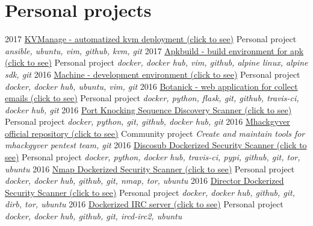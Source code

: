 \documentclass[]{friggeri-cv}
\begin{document}
\newpage

\section{Personal projects}
\begin{entrylist}
    \entry
        {2017}
        {\href{https://github.com/sweet-sinatra/ubuntu-install/tree/master/ansible}{KVManage - automatized kvm deployment (click to see)}}
        {Personal project}
        {\emph{ansible, ubuntu, vim, github, kvm, git}}
    \entry
        {2017}
        {\href{https://github.com/gr0und-s3ct0r/apkbuild}{Apkbuild - build environment for apk (click to see)}}
        {Personal project}
        {\emph{docker, docker hub, vim, github, alpine linux, alpine sdk, git}}
    \entry
        {2016}
        {\href{https://github.com/4383/machine}{Machine - development environment (click to see)}}
        {Personal project}
        {\emph{docker, docker hub, ubuntu, vim, git}}
    \entry
        {2016}
        {\href{https://github.com/4383/Botanick}{Botanick - web application for collect emails (click to see)}}
        {Personal project}
        {\emph{docker, python, flask, git, github, travis-ci, docker hub, git}}
    \entry
        {2016}
        {\href{https://github.com/mhackgyver-squad/porno-king}{Port Knocking Sequence Discovery Scanner (click to see)}}
        {Personal project}
        {\emph{docker, python, git, github, docker hub, git}}
    \entry
        {2016}
        {\href{https://github.com/mhackgyver-squad/mhackgyver}{Mhackgyver official repository (click to see)}}
        {Community project}
        {\emph{Create and maintain tools for mhackgyver pentest team, git}}
    \entry
        {2016}
        {\href{https://hub.docker.com/r/4383/discosub}{Discosub Dockerized Security Scanner (click to see)}}
        {Personal project}
        {\emph{docker, python, docker hub, travis-ci, pypi, github, git, tor, ubuntu}}
    \entry
        {2016}
        {\href{https://hub.docker.com/r/4383/system-service-footprint}{Nmap Dockerized Security Scanner (click to see)}}
        {Personal project}
        {\emph{docker, docker hub, github, git, nmap, tor, ubuntu}}
    \entry
        {2016}
        {\href{https://hub.docker.com/r/4383/director}{Director Dockerized Security Scanner (click to see)}}
        {Personal project}
        {\emph{docker, docker hub, github, git, dirb, tor, ubuntu}}
    \entry
        {2016}
        {\href{https://hub.docker.com/r/4383/irc-server}{Dockerized IRC server (click to see)}}
        {Personal project}
        {\emph{docker, docker hub, github, git, ircd-irc2, ubuntu}}

\end{entrylist}
\end{document}
